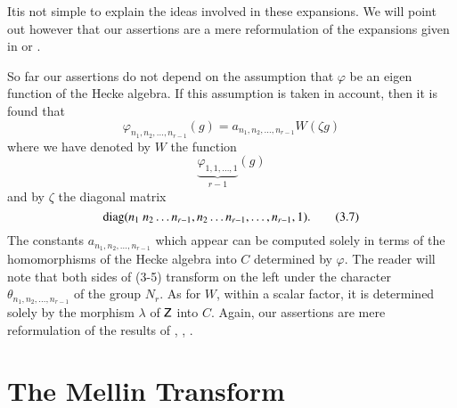 \eject

\noindent
It\pageoriginale is not simple to explain the ideas involved in these expansions. We will point out however that our assertions are a mere reformulation of the expansions given in \cite{art5-P1} or \cite{art5-Sha}.

So far our assertions do not depend on the assumption that $\varphi$ be an eigen function of the Hecke algebra. If this assumption is taken in account, then it is found that
\begin{equation*}
\varphi_{n_{1},n_{2},\ldots,n_{r-1}}(g)=a_{n_{1},n_{2},\ldots,n_{r-1}}W(\zeta g)\tag{3.5}\label{art5-eq3.5}
\end{equation*}
where we have denoted by $W$ the function
\begin{equation*}
\underbrace{\varphi_{1,1,\ldots,1}}_{r-1}(g)\tag{3.6}\label{art5-eq3.6}
\end{equation*}
and by $\zeta$ the diagonal matrix
\begin{equation*}
\diag (n_{1} \ n_{2}\ldots n_{r-1}, n_{2}\ldots n_{r-1},\ldots,n_{r-1},1).\tag{3.7}\label{art5-eq3.7}
\end{equation*}
The constants $a_{n_{1},n_{2},\ldots,n_{r-1}}$ which appear can be computed solely in terms of the homomorphisms of the Hecke algebra into $C$ determined by $\varphi$. The reader will note that both sides of (3-5) transform on the left under the character $\theta_{n_{1},n_{2},\ldots,n_{r-1}}$ of the group $N_{r}$. As for $W$, within a scalar factor, it is determined solely by the morphism $\lambda$ of $\mathsf{Z}$ into $C$. Again, our assertions are mere reformulation of the results of \cite{art5-C-S}, \cite{art5-Sha}, \cite{art5-Shi}.

\section{The Mellin Transform}\label{art5-sec4}

